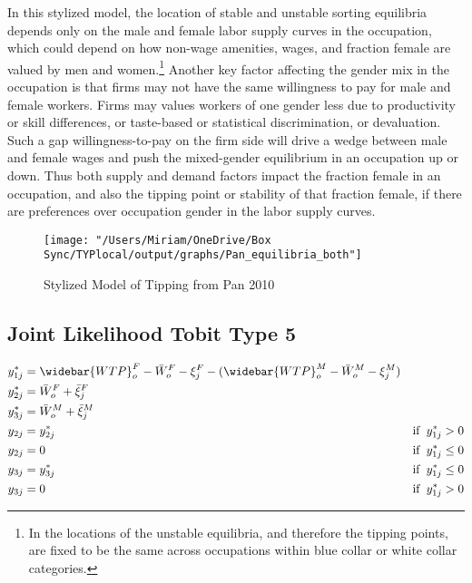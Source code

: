 \documentclass[12pt]{article}
\begin{document}
In this stylized model, the location of stable and unstable sorting equilibria depends only on the male and female labor supply curves in the occupation, which could depend on how non-wage amenities, wages, and fraction female are valued by men and women.\footnote{In  the locations of the unstable equilibria, and therefore the tipping points, are fixed to be the same across occupations within blue collar or white collar categories.} Another key factor affecting the gender mix in the occupation is that firms may not have the same willingness to pay for male and female workers. Firms may values workers of one gender less due to productivity or skill differences, or taste-based or statistical discrimination, or devaluation. Such a gap willingness-to-pay on the firm side will drive a wedge between male and female wages and push the mixed-gender equilibrium in an occupation up or down. Thus both supply and demand factors impact the fraction female in an occupation, and also the tipping point or stability of that fraction female, if there are preferences over occupation gender in the labor supply curves.

\begin{figure}[H]
\centering
\caption{Stylized Model of Tipping from Pan 2010}
\label{fig:tipping}
\texttt{[image: "/Users/Miriam/OneDrive/Box Sync/TYPlocal/output/graphs/Pan\_equilibria\_both"]}
\end{figure}

   
 \subsection{Joint Likelihood Tobit Type 5}\label{sec.likelihood}


\begin{align*}
y_{1j}^* &= \widebar{WTP}^F_o - \bar{W}^F_o  - \xi^F_j - (\widebar{WTP}^M_o - \bar{W}^M_o  - \xi^M_j) \\
y_{2j}^* &= \bar{W}^F_o + \bar{\xi}^F_j \\
y_{3j}^* &= \bar{W}^M_o + \bar{\xi}^M_j \\
y_{2j} &= y_{2j}^* \hspace{10mm} &\text{if} \hspace{2mm} y_{1j}^* >0 \\
y_{2j} &= 0 \hspace{10mm} &\text{if} \hspace{2mm} y_{1j}^* \leq 0 \\
y_{3j} &= y_{3j}^* \hspace{10mm} &\text{if} \hspace{2mm} y_{1j}^* \leq 0 \\
y_{3j} &= 0 \hspace{10mm} &\text{if} \hspace{2mm} y_{1j}^* > 0 \\
\end{align*}
\end{document}
